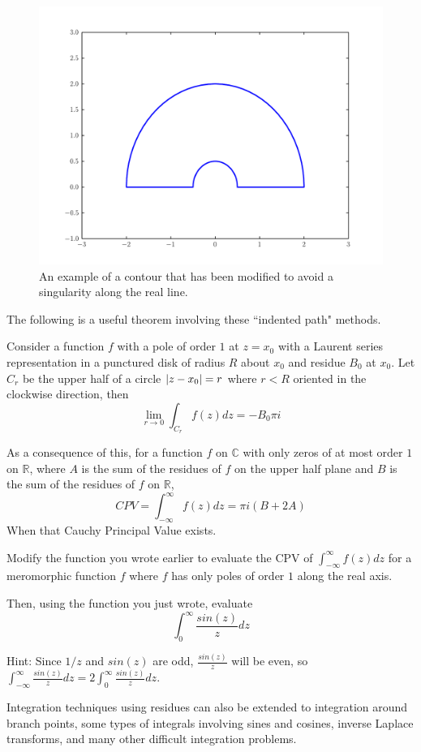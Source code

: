 \begin{figure}
\includegraphics[width=\textwidth]{contour2.pdf}
\caption{An example of a contour that has been modified to avoid a singularity along the real line.}
\label{complexint:c2}
\end{figure}

The following is a useful theorem involving these ``indented path" methods.
\begin{theorem}
Consider a function $f$ with a pole of order $1$ at $z=x_0$ with a Laurent series representation in a punctured disk of radius $R$ about $x_0$ and residue $B_0$ at $x_0$.
Let $C_r$ be the upper half of a circle $\left\lvert z-x_0\right\rvert=r$ where $r<R$ oriented in the clockwise direction, then
\[\lim_{r\to 0} \int_{C_r} f(z) dz = - B_0 \pi i\]
\end{theorem}
As a consequence of this, for a function $f$ on $\mathbb{C}$ with only zeros of at most order $1$ on $\mathbb{R}$, where $A$ is the sum of the residues of $f$ on the upper half plane and $B$ is the sum of the residues of $f$ on $\mathbb{R}$,
\[CPV = \int_{-\infty}^{\infty} f(z) dz = \pi i (B+2A)\]
When that Cauchy Principal Value exists.

\begin{problem}
Modify the function you wrote earlier to evaluate the CPV of $\int_{-\infty}^{\infty} f(z) dz$ for a meromorphic function $f$ where $f$ has only poles of order $1$ along the real axis.

Then, using the function you just wrote, evaluate
\[\int_{0}^{\infty} \frac{sin(z)}{z} dz\]

Hint: Since $1/z$ and $sin(z)$ are odd, $\frac{sin(z)}{z}$ will be even, so
$\int_{-\infty}^{\infty} \frac{sin(z)}{z} dz = 2 \int_{0}^{\infty} \frac{sin(z)}{z} dz$.
\end{problem}


Integration techniques using residues can also be extended to integration around branch points, some types of integrals involving sines and cosines, inverse Laplace transforms, and many other difficult integration problems.
